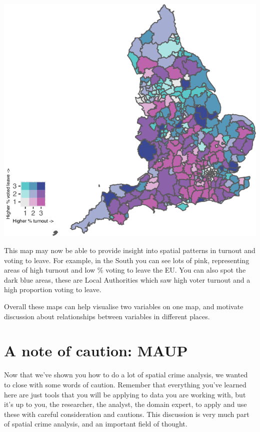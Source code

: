 \documentclass[
  krantz2]{krantz}
\begin{document}
\includegraphics{crime_mapping_files/figure-latex/unnamed-chunk-151-1.pdf}

This map may now be able to provide insight into spatial patterns in turnout and voting to leave. For example, in the South you can see lots of pink, representing areas of high turnout and low \% voting to leave the EU. You can also spot the dark blue areas, these are Local Authorities which saw high voter turnout and a high proportion voting to leave.

Overall these maps can help visualise two variables on one map, and motivate discussion about relationships between variables in different places.

\hypertarget{a-note-of-caution-maup}{%
\section{A note of caution: MAUP}\label{a-note-of-caution-maup}}

Now that we've shown you how to do a lot of spatial crime analysis, we wanted to close with some words of caution. Remember that everything you've learned here are just tools that you will be applying to data you are working with, but it's up to you, the researcher, the analyst, the domain expert, to apply and use these with careful consideration and cautions. This discussion is very much part of spatial crime analysis, and an important field of thought.
\end{document}
